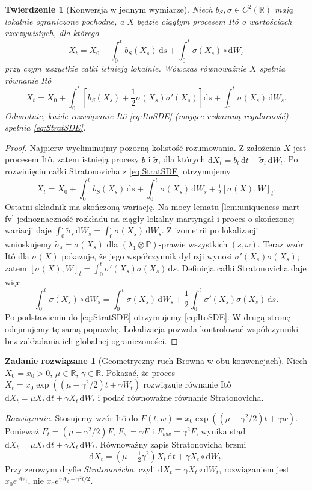 \documentclass[11pt,a4paper,oneside]{report}
\numberwithin{equation}{chapter}
\theoremstyle{plain}
\newtheorem{twierdzenie}{Twierdzenie}[chapter]
\theoremstyle{definition}
\newtheorem{zadanie}{Zadanie rozwiązane}[chapter]
\theoremstyle{remark}
\newcommand{\R}{\mathbb{R}}
\newcommand{\Prob}{\mathbb{P}}
\newcommand{\dd}{\mathrm{d}}
\begin{document}
\begin{twierdzenie}[Konwersja w jednym wymiarze]
\label{th:ito-strat-conversion}
Niech $b_S,\sigma\in C^2(\R)$ mają lokalnie ograniczone
pochodne, a $X$ będzie ciągłym procesem Itô o
wartościach rzeczywistych, dla którego
\[
X_t=X_0+\int_0^tb_S(X_s)\,\dd s
+\int_0^t\sigma(X_s)\circ\dd W_s
\tag{4.8}\label{eq:StratSDE}
\]
przy czym wszystkie całki istnieją lokalnie.
Wówczas równoważnie $X$ spełnia równanie Itô
\[
X_t=X_0+\int_0^t
\left[b_S(X_s)+\frac12\sigma(X_s)\sigma'(X_s)\right]\dd s
+\int_0^t\sigma(X_s)\,\dd W_s.
\tag{4.9}\label{eq:ItoSDE}
\]
Odwrotnie, każde rozwiązanie Itô \eqref{eq:ItoSDE}
(mające wskazaną regularność) spełnia \eqref{eq:StratSDE}.
\end{twierdzenie}
\begin{proof}
Najpierw wyeliminujmy pozorną kolistość rozumowania.
Z założenia $X$ jest procesem Itô, zatem istnieją
procesy $\widetilde b$ i $\widetilde\sigma$, dla których
$\dd X_t=\widetilde b_t\,\dd t+
\widetilde\sigma_t\,\dd W_t$. Po rozwinięciu całki
Stratonovicha z \eqref{eq:StratSDE} otrzymujemy
\[
X_t=X_0+\int_0^t b_S(X_s)\,\dd s
+\int_0^t\sigma(X_s)\,\dd W_s
+\tfrac12[\sigma(X),W]_t.
\]
Ostatni składnik ma skończoną wariację. Na mocy lematu \ref{lem:uniqueness-mart-fv}
jednoznaczność rozkładu na ciągły lokalny martyngał
i proces o skończonej wariacji daje
$\int_0^.\widetilde\sigma_s\,\dd W_s
=\int_0^.\sigma(X_s)\,\dd W_s$.
Z izometrii po lokalizacji wnioskujemy
$\widetilde\sigma_s=\sigma(X_s)$ dla
$(\lambda_1\otimes\Prob)$-prawie wszystkich $(s,\omega)$.
Teraz wzór Itô dla $\sigma(X)$ pokazuje, że jego
współczynnik dyfuzji wynosi
$\sigma'(X_s)\sigma(X_s)$; zatem
$[\sigma(X),W]_t=\int_0^t\sigma'(X_s)\sigma(X_s)\,\dd s$.
Definicja całki Stratonovicha daje więc
\[
\int_0^t\sigma(X_s)\circ\dd W_s
=\int_0^t\sigma(X_s)\,\dd W_s
+\frac12\int_0^t\sigma'(X_s)\sigma(X_s)\,\dd s.
\]
Po podstawieniu do \eqref{eq:StratSDE} otrzymujemy
\eqref{eq:ItoSDE}. W drugą stronę odejmujemy tę samą
poprawkę. Lokalizacja pozwala kontrolować współczynniki
bez zakładania ich globalnej ograniczoności.
\end{proof}

\begin{zadanie}[Geometryczny ruch Browna w obu konwencjach]
Niech $X_0=x_0>0$, $\mu\in\R$, $\gamma\in\R$.
Pokazać, że proces
$X_t=x_0\exp((\mu-\gamma^2/2)t+\gamma W_t)$
rozwiązuje równanie Itô
$\dd X_t=\mu X_t\,\dd t+\gamma X_t\,\dd W_t$
i podać równoważne równanie Stratonovicha.

\emph{Rozwiązanie.} Stosujemy wzór Itô do
$F(t,w)=x_0\exp((\mu-\gamma^2/2)t+\gamma w)$.
Ponieważ $F_t=(\mu-\gamma^2/2)F$,
$F_w=\gamma F$ i $F_{ww}=\gamma^2F$, wynika stąd
$\dd X_t=\mu X_t\,\dd t+\gamma X_t\,\dd W_t$.
Równoważny zapis Stratonovicha brzmi
\[
\dd X_t=(\mu-\tfrac12\gamma^2)X_t\,\dd t
+\gamma X_t\circ\dd W_t.
\]
Przy zerowym dryfie \emph{Stratonovicha}, czyli
$\dd X_t=\gamma X_t\circ\dd W_t$, rozwiązaniem jest
$x_0e^{\gamma W_t}$, nie
$x_0e^{\gamma W_t-\gamma^2t/2}$.
\end{zadanie}
\end{document}
